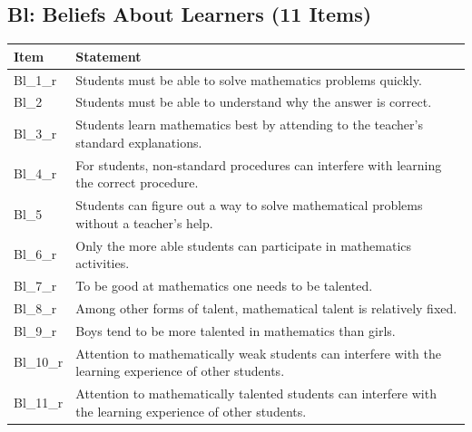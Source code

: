 \documentclass[
  man,
  floatsintext,
  longtable,
  nolmodern,
  notxfonts,
  notimes,
  colorlinks=true,linkcolor=blue,citecolor=blue,urlcolor=blue]{apa7}
\begin{document}
\normalsize

\newpage

\subsection{Bl: Beliefs About Learners (11
Items)}\label{bl-beliefs-about-learners-11-items}

\begin{table}

{\caption{{Beliefs about learners items.}{\label{tbl-item-bl}}}
\vspace{-20pt}}

\begin{longtable}[]{@{}
  >{\raggedright\arraybackslash}p{}
  >{\raggedright\arraybackslash}p{}@{}}
\toprule\noalign{}
\begin{minipage}[b]{\linewidth}\raggedright
Item
\end{minipage} & \begin{minipage}[b]{\linewidth}\raggedright
Statement
\end{minipage} \\
\midrule\noalign{}
\endhead
\bottomrule\noalign{}
\endlastfoot
Bl\_1\_r & Students must be able to solve mathematics problems
quickly. \\
Bl\_2 & Students must be able to understand why the answer is
correct. \\
Bl\_3\_r & Students learn mathematics best by attending to the teacher's
standard explanations. \\
Bl\_4\_r & For students, non-standard procedures can interfere with
learning the correct procedure. \\
Bl\_5 & Students can figure out a way to solve mathematical problems
without a teacher's help. \\
Bl\_6\_r & Only the more able students can participate in mathematics
activities. \\
Bl\_7\_r & To be good at mathematics one needs to be talented. \\
Bl\_8\_r & Among other forms of talent, mathematical talent is
relatively fixed. \\
Bl\_9\_r & Boys tend to be more talented in mathematics than girls. \\
Bl\_10\_r & Attention to mathematically weak students can interfere with
the learning experience of other students. \\
Bl\_11\_r & Attention to mathematically talented students can interfere
with the learning experience of other students. \\
\end{longtable}

\end{table}
\end{document}
